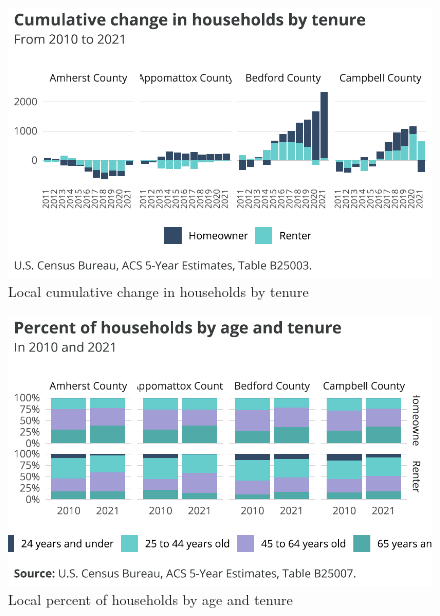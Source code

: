 \documentclass[
  letterpaper,
  DIV=11,
  numbers=noendperiod]{scrreprt}
\begin{document}
\begin{figure}[H]

{\centering \includegraphics{./part-3-2_files/figure-pdf/fig-localtenure-1.pdf}

}

\caption{\label{fig-localtenure}Local cumulative change in households by
tenure}

\end{figure}

\begin{figure}[H]

{\centering \includegraphics{./part-3-2_files/figure-pdf/fig-localage-1.pdf}

}

\caption{\label{fig-localage}Local percent of households by age and
tenure}

\end{figure}
\end{document}
